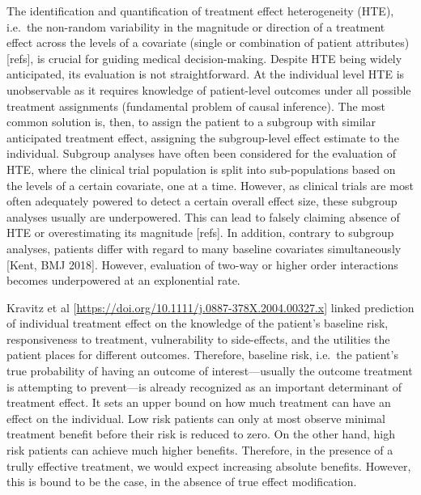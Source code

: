 \documentclass[
]{book}
\begin{document}
The identification and quantification of treatment effect heterogeneity (HTE),
i.e.~the non-random variability in the magnitude or direction of a treatment
effect across the levels of a covariate (single or combination of patient
attributes) {[}refs{]}, is crucial for guiding medical decision-making. Despite HTE
being widely anticipated, its evaluation is not straightforward. At the
individual level HTE is unobservable as it requires knowledge of patient-level
outcomes under all possible treatment assignments (fundamental problem of causal
inference). The most common solution is, then, to assign the patient to a
subgroup with similar anticipated treatment effect, assigning the subgroup-level
effect estimate to the individual. Subgroup analyses have often been considered
for the evaluation of HTE, where the clinical trial population is split into
sub-populations based on the levels of a certain covariate, one at a
time. However, as clinical trials are most often adequately powered to detect a
certain overall effect size, these subgroup analyses usually are
underpowered. This can lead to falsely claiming absence of HTE or overestimating
its magnitude {[}refs{]}. In addition, contrary to subgroup analyses, patients
differ with regard to many baseline covariates simultaneously {[}Kent, BMJ
2018{]}. However, evaluation of two-way or higher order interactions becomes
underpowered at an explonential rate.

Kravitz et al {[}\url{https://doi.org/10.1111/j.0887-378X.2004.00327.x}{]} linked
prediction of individual treatment effect on the knowledge of the patient's
baseline risk, responsiveness to treatment, vulnerability to side-effects, and
the utilities the patient places for different outcomes. Therefore, baseline
risk, i.e.~the patient's true probability of having an outcome of
interest---usually the outcome treatment is attempting to prevent---is already
recognized as an important determinant of treatment effect. It sets an upper
bound on how much treatment can have an effect on the individual. Low risk
patients can only at most observe minimal treatment benefit before their risk is
reduced to zero. On the other hand, high risk patients can achieve much higher
benefits. Therefore, in the presence of a trully effective treatment, we would
expect increasing absolute benefits. However, this is bound to be the case, in
the absence of true effect modification.
\end{document}
